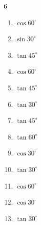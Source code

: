 \begin{multicols}{6}
\begin{enumerate}
  \item $\displaystyle \cos{60^\circ}$


  \item $\displaystyle \sin{30^\circ}$


  \item $\displaystyle \tan{45^\circ}$

        \phantom{$\displaystyle =1$}

  \item $\displaystyle \cos{60^\circ}$


  \item $\displaystyle \tan{45^\circ}$

        \phantom{$\displaystyle =1$}

  \item $\displaystyle \tan{30^\circ}$


  \item $\displaystyle \tan{45^\circ}$

        \phantom{$\displaystyle =1$}

  \item $\displaystyle \tan{60^\circ}$


  \item $\displaystyle \cos{30^\circ}$


  \item $\displaystyle \tan{30^\circ}$


  \item $\displaystyle \cos{60^\circ}$


  \item $\displaystyle \cos{30^\circ}$


  \item $\displaystyle \tan{30^\circ}$


\end{enumerate}
\end{multicols}
